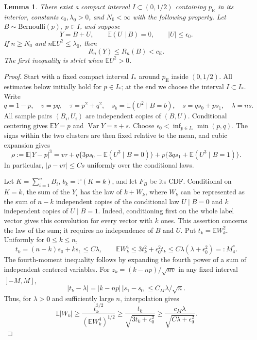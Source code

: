 \documentclass[aop]{imsart}
\theoremstyle{plain}
\newtheorem{lemma}[theorem]{Lemma}
\theoremstyle{definition}
\theoremstyle{definition}
\newcommand{\PP}{\mathbb P}
\newcommand{\EE}{\mathbb E}
\newcommand{\ce}{c_{\mathrm E}}
\newcommand{\pe}{p_{\mathrm E}}
\DeclareMathOperator{\Var}{Var}
\begin{document}
\begin{lemma}\label{lem:small-cluster-variance}
There exist a compact interval $I\subset(0,1/2)$ containing $\pe$ in its
interior, constants $\epsilon_0,\lambda_0>0$, and $N_0<\infty$ with
the following property. Let $B\sim\mathrm{Bernoulli}(p)$, $p\in I$,
and suppose
\[
 Y=B+U,\qquad \EE(U\mid B)=0,\qquad |U|\le\epsilon_0.
\]
If $n\ge N_0$ and $n\EE U^2\le\lambda_0$, then
\[
 R_n(Y)\le R_n(B)<\ce.
\]
The first inequality is strict when $\EE U^2>0$.
\end{lemma}

\begin{proof}
Start with a fixed compact interval $I_*$ around $\pe$ inside
$(0,1/2)$. All estimates below initially hold for $p\in I_*$;
at the end we choose the interval $I\subset I_*$. Write
\[
 q=1-p,\quad v=pq,\quad \tau=p^2+q^2,\quad
 s_b=\EE(U^2\mid B=b),\quad s=qs_0+ps_1,\quad\lambda=ns.
\]
All sample pairs $(B_i,U_i)$ are independent copies of $(B,U)$.
Conditional centering gives $\EE Y=p$ and $\Var Y=v+s$.
Choose $\epsilon_0<\inf_{p\in I_*}\min(p,q)$. The signs within the two
clusters are then fixed relative to the mean, and cubic expansion gives
\begin{equation}\label{eq:cluster-third-moment}
 \rho:=\EE|Y-p|^3
 =v\tau+q\{3ps_0-\EE(U^3\mid B=0)\}
       +p\{3qs_1+\EE(U^3\mid B=1)\}.
\end{equation}
In particular, $|\rho-v\tau|\le Cs$ uniformly over the conditional laws.

Let $K=\sum_{i=1}^nB_i$, $b_k=\PP(K=k)$, and let $F_B$ be its CDF.
Conditional on $K=k$, the sum of the $Y_i$ has the law of $k+W_k$,
where $W_k$ can be represented as the sum of $n-k$ independent copies of
the conditional law $U\mid B=0$ and $k$ independent copies of
$U\mid B=1$. Indeed, conditioning first on the whole label vector
gives this convolution for every vector with $k$ ones. This assertion
concerns the law of the sum; it requires no independence of $B$ and $U$.
Put $t_k=\EE W_k^2$. Uniformly for $0\le k\le n$,
\begin{equation}\label{eq:cluster-fourth-moment}
 t_k=(n-k)s_0+ks_1\le C\lambda,\qquad
 \EE W_k^4\le3t_k^2+\epsilon_0^2t_k
 \le C\lambda(\lambda+\epsilon_0^2)=:M_4^*.
\end{equation}
The fourth-moment inequality follows by expanding the fourth power of
a sum of independent centered variables.
For $z_k=(k-np)/\sqrt{nv}$ in any fixed interval $[-M,M]$,
\[
 |t_k-\lambda|=|k-np|\,|s_1-s_0|
 \le C_M\lambda/\sqrt n.
\]
Thus, for $\lambda>0$ and sufficiently large $n$, interpolation gives
\begin{equation}\label{eq:cluster-absolute-loss}
 \EE|W_k|\ge\frac{t_k^{3/2}}{(\EE W_k^4)^{1/2}}
 \ge\frac{t_k}{\sqrt{3t_k+\epsilon_0^2}}
 \ge\frac{c_M\lambda}{\sqrt{C\lambda+\epsilon_0^2}}.
\end{equation}


\end{proof}
\end{document}
